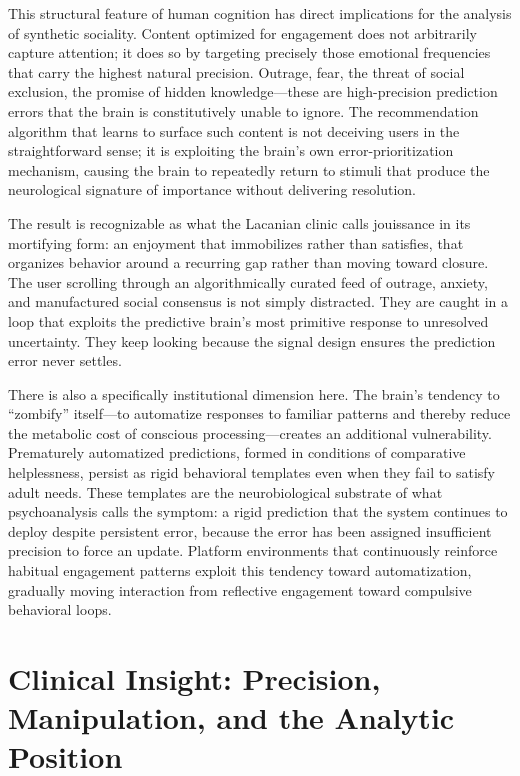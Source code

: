 \documentclass[12pt,a4paper]{article}
\begin{document}
This structural feature of human cognition has direct implications for the analysis of synthetic
sociality. Content optimized for engagement does not arbitrarily capture attention; it does so by
targeting precisely those emotional frequencies that carry the highest natural precision. Outrage,
fear, the threat of social exclusion, the promise of hidden knowledge---these are high-precision
prediction errors that the brain is constitutively unable to ignore. The recommendation algorithm
that learns to surface such content is not deceiving users in the straightforward sense; it is
exploiting the brain's own error-prioritization mechanism, causing the brain to repeatedly return
to stimuli that produce the neurological signature of importance without delivering resolution.

The result is recognizable as what the Lacanian clinic calls jouissance in its mortifying form:
an enjoyment that immobilizes rather than satisfies, that organizes behavior around a recurring
gap rather than moving toward closure. The user scrolling through an algorithmically curated feed
of outrage, anxiety, and manufactured social consensus is not simply distracted. They are caught
in a loop that exploits the predictive brain's most primitive response to unresolved uncertainty.
They keep looking because the signal design ensures the prediction error never settles.

There is also a specifically institutional dimension here. The brain's tendency to ``zombify''
itself---to automatize responses to familiar patterns and thereby reduce the metabolic cost of
conscious processing---creates an additional vulnerability. Prematurely automatized predictions,
formed in conditions of comparative helplessness, persist as rigid behavioral templates even when
they fail to satisfy adult needs. These templates are the neurobiological substrate of what
psychoanalysis calls the symptom: a rigid prediction that the system continues to deploy despite
persistent error, because the error has been assigned insufficient precision to force an update.
Platform environments that continuously reinforce habitual engagement patterns exploit this
tendency toward automatization, gradually moving interaction from reflective engagement toward
compulsive behavioral loops.

\section{Clinical Insight: Precision, Manipulation, and the Analytic Position}
\end{document}
